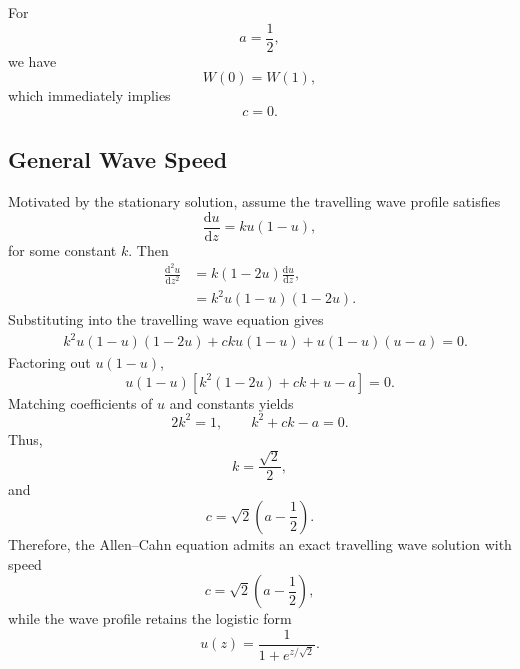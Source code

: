 For
\begin{equation*}
a=\frac12,
\end{equation*}
we have
\begin{equation*}
W(0)=W(1),
\end{equation*}
which immediately implies
\begin{equation*}
c=0.
\end{equation*}

\subsection*{General Wave Speed}

Motivated by the stationary solution, assume the travelling wave profile satisfies
\begin{equation*}
\frac{\mathrm{d}u}{\mathrm{d}z}
=
ku(1-u),
\end{equation*}
for some constant $k$.
Then
\begin{align*}
\frac{\mathrm{d}^2u}{\mathrm{d}z^2}
&=
k(1-2u)\frac{\mathrm{d}u}{\mathrm{d}z},
\\
&=
k^2u(1-u)(1-2u).
\end{align*}
Substituting into the travelling wave equation gives
\begin{align*}
&
k^2u(1-u)(1-2u)
+
cku(1-u)
+
u(1-u)(u-a)
=
0.
\end{align*}
Factoring out $u(1-u)$,
\begin{equation*}
u(1-u)
\left[
k^2(1-2u)+ck+u-a
\right]
=
0.
\end{equation*}
Matching coefficients of $u$ and constants yields
\begin{equation*}
2k^2=1,
\qquad
k^2+ck-a=0.
\end{equation*}
Thus,
\begin{equation*}
k=\frac{\sqrt{2}}{2},
\end{equation*}
and
\begin{equation*}
c
=
\sqrt{2}
\left(
a-\frac12
\right).
\end{equation*}
Therefore, the Allen--Cahn equation admits an exact travelling wave solution with speed
\begin{equation*}
c=\sqrt{2}\left(a-\frac12\right),
\end{equation*}
while the wave profile retains the logistic form
\begin{equation*}
u(z)
=
\frac{1}{1+e^{z/\sqrt{2}}}.
\end{equation*}